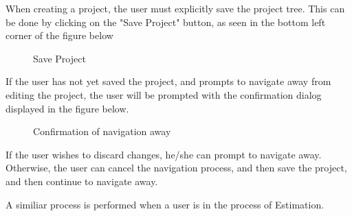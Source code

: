 When creating a project, the user must explicitly save the project tree. This can be done by clicking on the "Save Project" button, as seen in the bottom left corner of the figure below

	\begin{figure}[H]
	    	\centering
	    	\caption{Save Project}
	    	\label{fig: Save Project}
   	\end{figure}

If the user has not yet saved the project, and prompts to navigate away from editing the project, the user will be prompted with the confirmation dialog displayed in the figure below.

	\begin{figure}[H]
	    	\centering
	    	\caption{Confirmation of navigation away}
	    	\label{fig: Confirmation}
   	\end{figure}

If the user wishes to discard changes, he/she can prompt to navigate away. Otherwise, the user can cancel the navigation process, and then save the project, and then continue to navigate away.

A similiar process is performed when a user is in the process of Estimation.